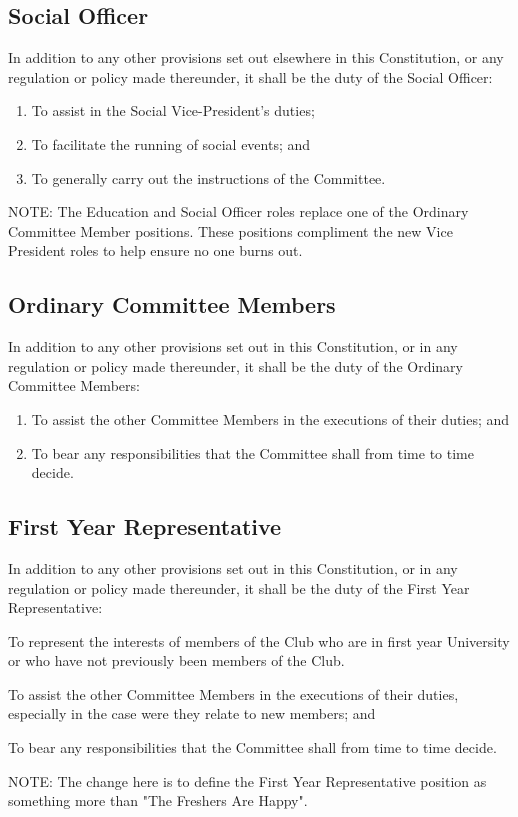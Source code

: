 \documentclass[11pt]{article} %
\begin{document}
{\color{ForestGreen} \subsection{Social Officer}
In addition to any other provisions set out elsewhere in this Constitution, or any regulation or policy made thereunder, it shall be the duty of the Social Officer:
\begin{enumerate}
	\item To assist in the Social Vice-President's duties;
	\item To facilitate the running of social events; and
	\item To generally carry out the instructions of the Committee.
\end{enumerate}}

{\color{Cyan}NOTE:
The Education and Social Officer roles replace one of the Ordinary Committee Member positions.
These positions compliment the new Vice President roles to help ensure no one burns out.
}

\subsection{Ordinary Committee Members}
In addition to any other provisions set out in this Constitution, or in any regulation or policy made thereunder, it shall be the duty of the Ordinary Committee Members:
\begin{enumerate}
	\item To assist the other Committee Members in the executions of their duties; and
	\item To bear any responsibilities that the Committee shall from time to time decide.
\end{enumerate}

\subsection{First Year Representative}
In addition to any other provisions set out in this Constitution, or in any regulation or policy made thereunder, it shall be the duty of the First Year Representative:
\begin{enumerate}
	\item To represent the interests of members of the Club who are in first year University or who have not previously been members of the Club.
	{\color{ForestGreen}\item To assist the other Committee Members in the executions of their duties, especially in the case were they relate to new members; and
	\item To bear any responsibilities that the Committee shall from time to time decide.}
\end{enumerate}
{\color{Cyan}NOTE:
The change here is to define the First Year Representative position as something more than "The Freshers Are Happy".
}
\end{document}
